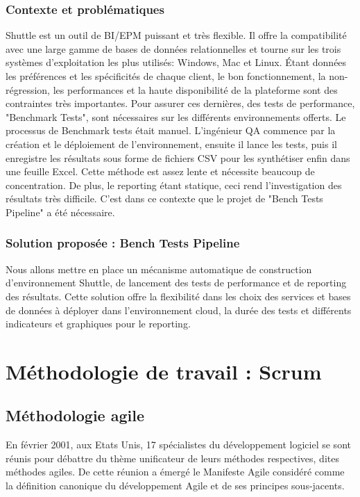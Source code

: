 \begin{spacing}{1.2}
\subsubsection{Contexte et problématiques}
Shuttle est un outil de BI/EPM puissant et très flexible\cite{intern}. Il offre la compatibilité avec une large gamme de bases de données relationnelles et tourne sur les trois systèmes d'exploitation les plus utilisés: Windows, Mac et Linux. Étant données les préférences et les spécificités de chaque client, le bon fonctionnement, la non-régression, les performances et la haute disponibilité de la plateforme sont des contraintes très importantes. 
Pour assurer ces dernières, des tests de performance, "Benchmark Tests", sont nécessaires sur les différents environnements offerts. 
Le processus de Benchmark tests était manuel. L'ingénieur QA commence par la création et le déploiement de l'environnement, ensuite il lance les tests, puis il enregistre les résultats sous forme de fichiers CSV pour les synthétiser enfin dans une feuille Excel. Cette méthode est assez lente et nécessite beaucoup de concentration. De plus, le reporting étant statique, ceci rend l'investigation des résultats très difficile. 
C'est dans ce contexte que le projet de "Bench Tests Pipeline" a été nécessaire.
\subsubsection{Solution proposée : Bench Tests Pipeline}
Nous allons mettre en place un mécanisme automatique de construction d'environnement Shuttle, de lancement des tests de performance et de reporting des résultats. Cette solution offre la flexibilité dans les choix des services et bases de données à déployer dans l'environnement cloud, la durée des tests et différents indicateurs et graphiques pour le reporting.
\section{Méthodologie de travail : Scrum}
\subsection{Méthodologie agile}
En février 2001, aux Etats Unis, 17 spécialistes du développement logiciel se sont réunis pour débattre du thème unificateur de leurs méthodes respectives, dites méthodes agiles. De cette réunion a émergé le Manifeste Agile considéré comme la définition canonique du développement Agile et de ses principes sous-jacents. 


\end{spacing}
